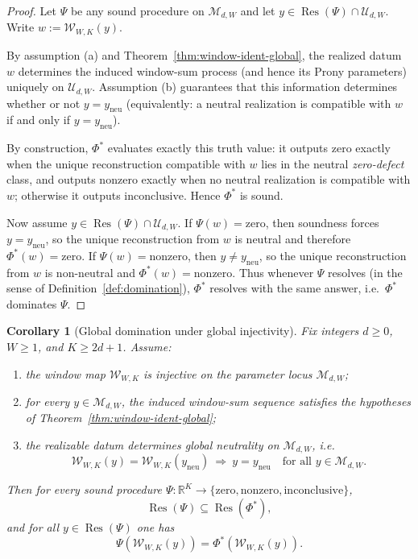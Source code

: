 \documentclass[11pt,reqno]{amsart}
\newtheorem{corollary}[theorem]{Corollary}
\theoremstyle{definition}
\theoremstyle{remark}
\newcommand{\R}{\mathbb{R}}
\newcommand{\1}{\mathbf{1}}
\newcommand{\zero}{\mathrm{zero}}
\newcommand{\nonzero}{\mathrm{nonzero}}
\newcommand{\inconclusive}{\mathrm{inconclusive}}
\begin{document}
\begin{proof}
Let $\Psi$ be any sound procedure on $\mathcal{M}_{d,W}$ and let $y\in\operatorname{Res}(\Psi)\cap\mathcal{U}_{d,W}$.
Write $w:=\mathcal{W}_{W,K}(y)$.


By assumption (a) and Theorem~\ref{thm:window-ident-global}, the realized datum $w$ determines the induced window-sum process (and hence its Prony parameters) uniquely on $\mathcal{U}_{d,W}$.
Assumption (b) guarantees that this information determines whether or not $y=y_{\mathrm{neu}}$ (equivalently: a neutral realization is compatible with $w$ if and only if $y=y_{\mathrm{neu}}$).

By construction, $\Phi^\ast$ evaluates exactly this truth value: it outputs $\zero$ exactly when the unique
reconstruction compatible with $w$ lies in the neutral \emph{zero-defect} class, and outputs $\nonzero$ exactly when
no neutral realization is compatible with $w$; otherwise it outputs $\inconclusive$.
Hence $\Phi^\ast$ is sound.

Now assume $y\in\operatorname{Res}(\Psi)\cap\mathcal{U}_{d,W}$. If $\Psi(w)=\zero$, then soundness forces $y=y_{\mathrm{neu}}$, so the unique
reconstruction from $w$ is neutral and therefore $\Phi^\ast(w)=\zero$.
If $\Psi(w)=\nonzero$, then $y\neq y_{\mathrm{neu}}$, so the unique reconstruction from $w$ is non-neutral and
$\Phi^\ast(w)=\nonzero$.
Thus whenever $\Psi$ resolves (in the sense of Definition~\ref{def:domination}), $\Phi^\ast$ resolves with the same answer, i.e.\ $\Phi^\ast$ dominates $\Psi$.
\end{proof}


\begin{corollary}[Global domination under global injectivity]\label{cor:domination-global}
Fix integers $d\ge 0$, $W\ge 1$, and $K\ge 2d+1$.
Assume:
\begin{enumerate}[label=\textup{(\alph*)},leftmargin=2.2em]
\item the window map $\mathcal{W}_{W,K}$ is injective on the parameter locus $\mathcal M_{d,W}$;
\item for every $y\in\mathcal M_{d,W}$, the induced window-sum sequence satisfies the hypotheses of Theorem~\ref{thm:window-ident-global};
\item the realizable datum determines global neutrality on $\mathcal M_{d,W}$, i.e.\ \[
\mathcal{W}_{W,K}(y)=\mathcal{W}_{W,K}(y_{\mathrm{neu}})\ \Longrightarrow\ y=y_{\mathrm{neu}}
\quad\text{for all }y\in\mathcal M_{d,W}.
\]
\end{enumerate}
Then for every sound procedure $\Psi:\R^K\to\{\zero,\nonzero,\inconclusive\}$,
\[
\operatorname{Res}(\Psi)\subseteq \operatorname{Res}(\Phi^\ast),
\]
and for all $y\in\operatorname{Res}(\Psi)$ one has
\[
\Psi(\mathcal W_{W,K}(y))=\Phi^\ast(\mathcal W_{W,K}(y)).
\]
\end{corollary}
\end{document}
